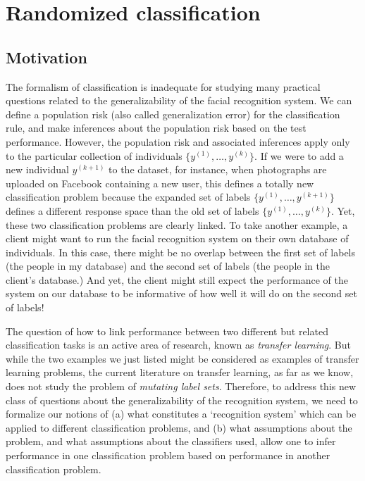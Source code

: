 \section{Randomized classification}\label{sec:rc_motivation}

\subsection{Motivation}
The formalism of classification is inadequate for studying
many practical questions related to the generalizability of the facial
recognition system.  We can define a population risk (also called
generalization error) for the classification rule, and make inferences
about the population risk based on the test performance.  However, the
population risk and associated inferences apply only to the particular
collection of individuals $\{y^{(1)},\hdots, y^{(k)}\}$.  If we were
to add a new individual $y^{(k+1)}$ to the dataset, for instance, when
photographs are uploaded on Facebook containing a new user, this
defines a totally new classification problem because the expanded set
of labels $\{y^{(1)},\hdots, y^{(k+1)}\}$ defines a different response
space than the old set of labels $\{y^{(1)},\hdots, y^{(k)}\}$.  Yet,
these two classification problems are clearly linked.  To take another
example, a client might want to run the facial recognition system on
their own database of individuals.  In this case, there might be no
overlap between the first set of labels (the people in my database)
and the second set of labels (the people in the client's database.)
And yet, the client might still expect the performance of the system
on our database to be informative of how well it will do on the second
set of labels!

The question of how to link performance between two different but
related classification tasks is an active area of research, known as
\emph{transfer learning}.  But while the two examples we just listed
might be considered as examples of transfer learning problems, the
current literature on transfer learning, as far as we know, does not
study the problem of \emph{mutating label sets}.  Therefore, to
address this new class of questions about the generalizability of the
recognition system, we need to formalize our notions of (a) what
constitutes a `recognition system' which can be applied to different
classification problems, and (b) what assumptions about the problem,
and what assumptions about the classifiers used, allow one to infer
performance in one classification problem based on performance in
another classification problem.

